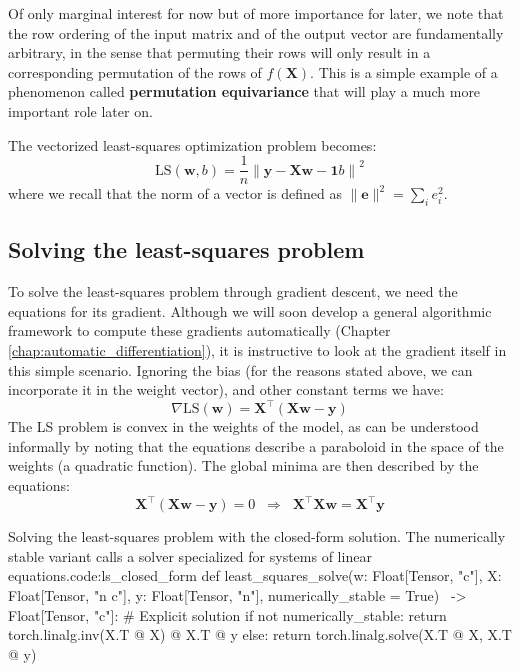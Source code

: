 Of only marginal interest for now but of more importance for later, we note that the row ordering of the input matrix and of the output vector are fundamentally arbitrary, in the sense that permuting their rows will only result in a corresponding permutation of the rows of $f(\mathbf{X})$. This is a simple example of a phenomenon called \textbf{permutation equivariance} that will play a much more important role later on.

The vectorized least-squares optimization problem becomes:
%
\begin{equation}
\text{LS}(\mathbf{w},b) =  \frac{1}{n} \left\lVert \mathbf{y} - \mathbf{X}\mathbf{w} - \mathbf{1}b \right\rVert^2 
\label{eq:ls_vectorized}
\end{equation}
%
where we recall that the norm of a vector is defined as $\lVert \mathbf{e} \rVert^2 = \sum_i e_i^2$.

\subsection{Solving the least-squares problem}

To solve the least-squares problem through gradient descent, we need the equations for its gradient. Although we will soon develop a general algorithmic framework to compute these gradients automatically (Chapter \ref{chap:automatic_differentiation}), it is instructive to look at the gradient itself in this simple scenario. Ignoring the bias (for the reasons stated above, we can incorporate it in the weight vector), and other constant terms we have:
%
$$
\nabla \text{LS}(\mathbf{w}) = \mathbf{X}^\top\left( \mathbf{X}\mathbf{w} - \mathbf{y} \right)
$$
%
The LS problem is convex in the weights of the model, as can be understood informally by noting that the equations describe a paraboloid in the space of the weights (a quadratic function). The global minima are then described by the equations:
%
$$
\mathbf{X}^\top\left( \mathbf{X}\mathbf{w} - \mathbf{y} \right) = 0 \;\;\Rightarrow\;\; \mathbf{X}^\top\mathbf{X}\mathbf{w} = \mathbf{X}^\top\mathbf{y}
$$

\begin{mypy}{Solving the least-squares problem with the closed-form solution. The numerically stable variant calls a solver specialized for systems of linear equations.}{code:ls_closed_form}
def least_squares_solve(w: Float[Tensor, "c"],
                        X: Float[Tensor, "n c"],
                        y: Float[Tensor, "n"],
                        numerically_stable = True) \
                        -> Float[Tensor, "c"]:
  # Explicit solution
  if not numerically_stable:
    return torch.linalg.inv(X.T @ X) @ X.T @ y 
  else:
    return torch.linalg.solve(X.T @ X, X.T @ y)
\end{mypy}

